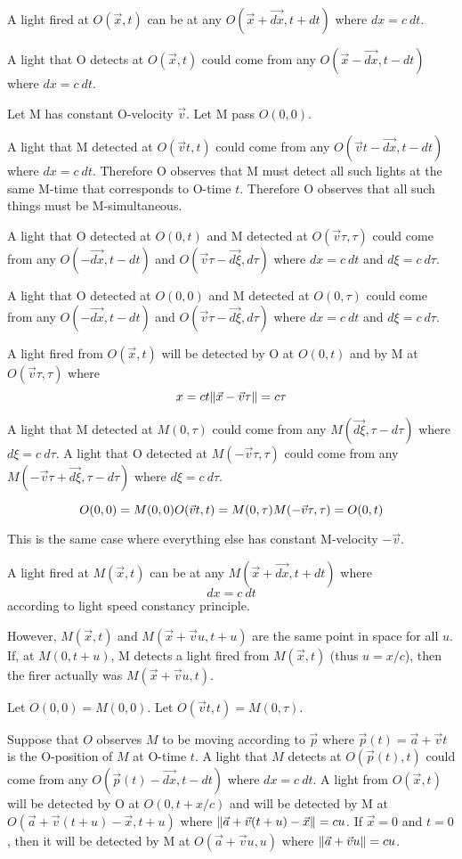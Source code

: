 A light fired at $O(\vec{x},t)$ can be at any $O(\vec{x}+\vec{dx},t+dt)$
where $dx = c~dt$.

A light that O detects at $O(\vec{x},t)$ could come from any $O(\vec{x}-\vec{dx},t-dt)$ where
$dx = c~dt$.

Let M has constant O-velocity $\vec{v}$.
Let M pass $O(0,0)$.

A light that M detected at $O(\vec{v}t,t)$ could come from any $O(\vec{v}t-\vec{dx},t-dt)$ where $dx = c~dt$.
Therefore O observes that M must detect all such lights at the same M-time that corresponds to O-time $t$.
Therefore O observes that all such things must be M-simultaneous.

A light that O detected at $O(0,t)$ and M detected at $O(\vec{v}\tau,\tau)$
could come from any $O(-\vec{dx},t-dt)$ and $O(\vec{v}\tau-\vec{d\xi},d\tau)$ where $dx = c~dt$ and $d\xi = c~d\tau$.

A light that O detected at $O(0,0)$ and M detected at $O(0,\tau)$
could come from any $O(-\vec{dx},t-dt)$ and $O(\vec{v}\tau-\vec{d\xi},d\tau)$ where $dx = c~dt$ and $d\xi = c~d\tau$.

A light fired from $O(\vec{x},t)$ will be detected by O at $O(0,t)$ and by M at $O(\vec{v}\tau, \tau)$
where
\[
x = ct
\\
\norm{\vec{x} - \vec{v}\tau} = c\tau 
\]

A light that M detected at $M(0,\tau)$ could come from any $M(\vec{d\xi},\tau-d\tau)$ where $d\xi = c~d\tau$.
A light that O detected at $M(-\vec{v}\tau,\tau)$ could come from any $M(-\vec{v}\tau+\vec{d\xi},\tau-d\tau)$ where $d\xi = c~d\tau$.

\[
O(0,0) = M(0,0)
\\ O(\vec{v}t,t) = M(0,\tau)
\\ M(-\vec{v}\tau,\tau) = O(0,t)
\]

This is the same case where everything else has constant M-velocity $-\vec{v}$.

A light fired at $M(\vec{x},t)$ can be at any $M(\vec{x}+\vec{dx},t+dt)$ where
\[
dx = c~dt
\]
according to light speed constancy principle.

However, $M(\vec{x},t)$ and $M(\vec{x}+\vec{v}u,t+u)$ are the same point in space for all $u$.
If, at $M(0,t+u)$, M detects a light fired from $M(\vec{x},t)$ (thus $u=x/c$),
then the firer actually was $M(\vec{x}+\vec{v}u,t)$.

Let $O(0,0) = M(0,0)$.
Let $O(\vec{v}t,t) = M(0,\tau)$.

Suppose that $O$ observes $M$ to be moving according to $\vec{p}$
where $\vec{p}(t) = \vec{a} + \vec{v}t$ is the O-position of $M$ at O-time $t$.
A light that $M$ detects at $O(\vec{p}(t),t)$ could come from any $O(\vec{p}(t)-\vec{dx},t-dt)$
where $dx = c~dt$.
A light from $O(\vec{x},t)$ will be detected by O at $O(0,t+x/c)$
and will be detected by M at $O(\vec{a}+\vec{v}(t+u)-\vec{x},t+u)$
where $\norm{\vec{a}+\vec{v}(t+u)-\vec{x}} = cu$.
If $\vec{x}=0$ and $t=0$, then it will be detected by M at $O(\vec{a}+\vec{v}u,u)$ where $\norm{\vec{a}+\vec{v}u}=cu$.

